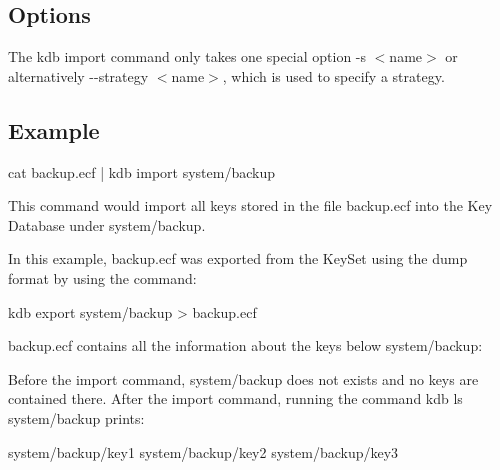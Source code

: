\subsection*{Options}

The kdb import command only takes one special option {\ttfamily -\/s $<$name$>$} or alternatively {\ttfamily -\/-\/strategy $<$name$>$}, which is used to specify a strategy.

\subsection*{Example}


\begin{DoxyCode}
cat backup.ecf | kdb import system/backup
\end{DoxyCode}


This command would import all keys stored in the file {\ttfamily backup.\+ecf} into the Key Database under {\ttfamily system/backup}.

In this example, {\ttfamily backup.\+ecf} was exported from the Key\+Set using the dump format by using the command\+:


\begin{DoxyCode}
kdb export system/backup > backup.ecf
\end{DoxyCode}


{\ttfamily backup.\+ecf} contains all the information about the keys below {\ttfamily system/backup}\+:




Before the import command, {\ttfamily system/backup} does not exists and no keys are contained there. After the import command, running the command {\ttfamily kdb ls system/backup} prints\+: \begin{DoxyVerb}    system/backup/key1
    system/backup/key2
    system/backup/key3\end{DoxyVerb}
 